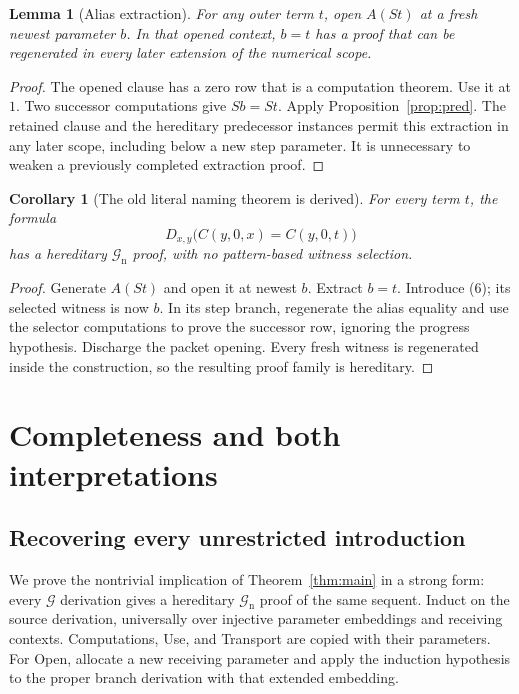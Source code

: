 \documentclass[11pt]{article}
\newtheorem{lemma}[theorem]{Lemma}
\newtheorem{corollary}[theorem]{Corollary}
\theoremstyle{definition}\newtheorem{definition}[theorem]{Definition}
\theoremstyle{remark}\newtheorem{remark}[theorem]{Remark}
\newcommand{\G}{\mathcal G}
\newcommand{\Gn}{\mathcal G_{\mathrm n}}
\begin{document}
\begin{lemma}[Alias extraction]
\label{lem:alias}
For any outer term $t$, open $A(St)$ at a fresh newest parameter $b$.
In that opened context, $b=t$ has a proof that can be regenerated in
every later extension of the numerical scope.
\end{lemma}
\begin{proof}
The opened clause has a zero row that is a computation theorem. Use
it at $1$. Two successor computations give $Sb=St$. Apply
Proposition~\ref{prop:pred}. The retained clause and the hereditary
predecessor instances permit this extraction in any later scope,
including below a new step parameter. It is unnecessary to weaken a
previously completed extraction proof.
\end{proof}

\begin{corollary}[The old literal naming theorem is derived]
\label{cor:name}
For every term $t$, the formula
\[
 D_{x,y}\bigl(C(y,0,x)=C(y,0,t)\bigr)                     \tag{6}
\]
has a hereditary $\Gn$ proof, with no pattern-based witness selection.
\end{corollary}
\begin{proof}
Generate $A(St)$ and open it at newest $b$. Extract $b=t$.
Introduce (6); its selected witness is now $b$. In its step branch,
regenerate the alias equality and use the selector computations to
prove the successor row, ignoring the progress hypothesis. Discharge
the packet opening. Every fresh witness is regenerated inside the
construction, so the resulting proof family is hereditary.
\end{proof}

\section{Completeness and both interpretations}
\label{sec:completeness}

\subsection{Recovering every unrestricted introduction}

We prove the nontrivial implication of Theorem~\ref{thm:main} in a
strong form: every $\G$ derivation gives a hereditary $\Gn$ proof of
the same sequent. Induct on the source derivation, universally over
injective parameter embeddings and receiving contexts. Computations,
Use, and Transport are copied with their parameters. For Open, allocate
a new receiving parameter and apply the induction hypothesis to the
proper branch derivation with that extended embedding.
\end{document}
